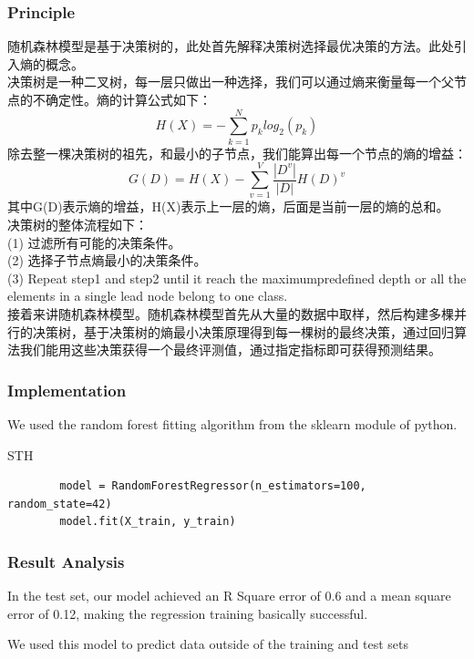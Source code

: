 \documentclass[a4paper]{article}
\begin{document}
\subsubsection{Principle}
随机森林模型是基于决策树的，此处首先解释决策树选择最优决策的方法。此处引入熵的概念。\\
决策树是一种二叉树，每一层只做出一种选择，我们可以通过熵来衡量每一个父节点的不确定性。熵的计算公式如下：\\
$$H(X)= -\sum_{k=1}^N p_k log_2(p_k)$$
除去整一棵决策树的祖先，和最小的子节点，我们能算出每一个节点的熵的增益：
$$G(D)= H(X)-\sum_{v=1}^V \frac {\left|D^v\right|}{\left|D\right|} H(D)^v$$
其中G(D)表示熵的增益，H(X)表示上一层的熵，后面是当前一层的熵的总和。\\
决策树的整体流程如下：\\
(1) 过滤所有可能的决策条件。\\
(2) 选择子节点熵最小的决策条件。\\
(3) Repeat step1 and step2 until it reach the maximumpredefined depth or all the elements in a single lead node belong to one class.\\[1em]
接着来讲随机森林模型。随机森林模型首先从大量的数据中取样，然后构建多棵并行的决策树，基于决策树的熵最小决策原理得到每一棵树的最终决策，通过回归算法我们能用这些决策获得一个最终评测值，通过指定指标即可获得预测结果。
\subsubsection{Implementation}
We used the random forest fitting algorithm from the sklearn module of python.
\begin{listing}[htb]\caption{STH}\label{code:processdweet}
    \begin{verbatim}
        model = RandomForestRegressor(n_estimators=100, random_state=42)
        model.fit(X_train, y_train)
\end{verbatim} 
\end{listing}


\subsubsection{Result Analysis}
In the test set, our model achieved an R Square error of 0.6 and a mean square error of 0.12, making the regression training basically successful.

We used this model to predict data outside of the training and test sets
\end{document}
